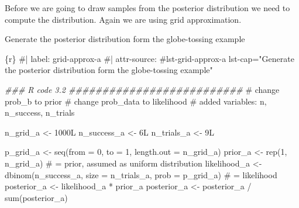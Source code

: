 \documentclass[
  letterpaper,
  DIV=11,
  numbers=noendperiod]{scrreprt}
\newenvironment{Shaded}{\begin{snugshade}}{\end{snugshade}}
\newcommand{\AttributeTok}[1]{\textcolor[rgb]{0.40,0.45,0.13}{#1}}
\newcommand{\CommentTok}[1]{\textcolor[rgb]{0.37,0.37,0.37}{#1}}
\newcommand{\DecValTok}[1]{\textcolor[rgb]{0.68,0.00,0.00}{#1}}
\newcommand{\DocumentationTok}[1]{\textcolor[rgb]{0.37,0.37,0.37}{\textit{#1}}}
\newcommand{\FunctionTok}[1]{\textcolor[rgb]{0.28,0.35,0.67}{#1}}
\newcommand{\InformationTok}[1]{\textcolor[rgb]{0.37,0.37,0.37}{#1}}
\newcommand{\NormalTok}[1]{\textcolor[rgb]{0.00,0.23,0.31}{#1}}
\newcommand{\OtherTok}[1]{\textcolor[rgb]{0.00,0.23,0.31}{#1}}
\newcommand{\SpecialCharTok}[1]{\textcolor[rgb]{0.37,0.37,0.37}{#1}}
\begin{document}
Before we are going to draw samples from the posterior distribution we
need to compute the distribution. Again we are using grid approximation.

\begin{codelisting}

\caption{Generate the posterior distribution form the globe-tossing
example}

\hypertarget{lst-grid-approx-a}{%
\label{lst-grid-approx-a}}%
\begin{Shaded}
\begin{Highlighting}[]
\InformationTok{\textasciigrave{}\textasciigrave{}\textasciigrave{}\{r\}}
\CommentTok{\#| label: grid{-}approx{-}a}
\CommentTok{\#| attr{-}source: \textquotesingle{}\#lst{-}grid{-}approx{-}a lst{-}cap="Generate the posterior distribution form the globe{-}tossing example"\textquotesingle{}}

\DocumentationTok{\#\#\# R code 3.2 \#\#\#\#\#\#\#\#\#\#\#\#\#\#\#\#\#\#\#\#\#\#\#\#\#\#}
\CommentTok{\# change prob\_b to prior}
\CommentTok{\# change prob\_data to likelihood}
\CommentTok{\# added variables: n, n\_success, n\_trials}

\NormalTok{n\_grid\_a }\OtherTok{\textless{}{-}}\NormalTok{ 1000L}
\NormalTok{n\_success\_a }\OtherTok{\textless{}{-}}\NormalTok{ 6L}
\NormalTok{n\_trials\_a }\OtherTok{\textless{}{-}}\NormalTok{  9L}


\NormalTok{p\_grid\_a }\OtherTok{\textless{}{-}} \FunctionTok{seq}\NormalTok{(}\AttributeTok{from =} \DecValTok{0}\NormalTok{, }\AttributeTok{to =} \DecValTok{1}\NormalTok{, }\AttributeTok{length.out =}\NormalTok{ n\_grid\_a)}
\NormalTok{prior\_a }\OtherTok{\textless{}{-}} \FunctionTok{rep}\NormalTok{(}\DecValTok{1}\NormalTok{, n\_grid\_a) }\CommentTok{\# = prior, assumed as uniform distribution}
\NormalTok{likelihood\_a }\OtherTok{\textless{}{-}} \FunctionTok{dbinom}\NormalTok{(n\_success\_a, }\AttributeTok{size =}\NormalTok{ n\_trials\_a, }\AttributeTok{prob =}\NormalTok{ p\_grid\_a) }\CommentTok{\# = likelihood}
\NormalTok{posterior\_a }\OtherTok{\textless{}{-}}\NormalTok{ likelihood\_a }\SpecialCharTok{*}\NormalTok{ prior\_a}
\NormalTok{posterior\_a }\OtherTok{\textless{}{-}}\NormalTok{ posterior\_a }\SpecialCharTok{/} \FunctionTok{sum}\NormalTok{(posterior\_a)}
\InformationTok{\textasciigrave{}\textasciigrave{}\textasciigrave{}}
\end{Highlighting}
\end{Shaded}

\end{codelisting}
\end{document}
